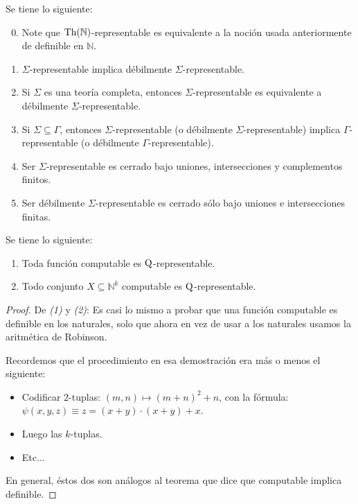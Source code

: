 \documentclass[12pt]{report}
\newcounter{it}
\theoremstyle{largebreak}
\begin{document}
    \begin{obs}
        Se tiene lo siguiente:
        \begin{enumerate}[label = \textit{(\arabic*)}]
            \setcounter{enumi}{-1}
            \item Note que $\textup{Th}(\mathbb{N})$-representable es equivalente a la noción usada anteriormente de definible en $\mathbb{N}$.
            \item $\Sigma$-representable implica débilmente $\Sigma$-representable.
            \item Si $\Sigma$ es una teoría completa, entonces $\Sigma$-representable es equivalente a débilmente $\Sigma$-representable.
            \item Si $\Sigma\subseteq\Gamma$, entonces $\Sigma$-representable (o débilmente $\Sigma$-representable) implica $\Gamma$-representable (o débilmente $\Gamma$-representable).
            \item Ser $\Sigma$-representable es cerrado bajo uniones, intersecciones y complementos finitos.
            \item Ser débilmente $\Sigma$-representable es cerrado sólo bajo uniones e intersecciones finitas.
        \end{enumerate}
    \end{obs}

    \begin{theor}
        Se tiene lo siguiente:
        \begin{enumerate}[label = \textit{(\arabic*)}]
            \item Toda función computable es $\textup{Q}$-representable.
            \item Todo conjunto $X\subseteq\mathbb{N}^k$ computable es $\textup{Q}$-representable.
        \end{enumerate}
    \end{theor}

    \begin{proof}
        De \textit{(1)} y \textit{(2)}: Es casi lo mismo a probar que una función computable es definible en los naturales, solo que ahora en vez de usar a los naturales usamos la aritmética de Robinson.

        Recordemos que el procedimiento en esa demostración era más o menos el siguiente:
        \begin{itemize}
            \item Codificar 2-tuplas: $(m,n)\mapsto(m+n)^2+n$, con la fórmula: $\psi(x,y,z)\equiv z=(x+y)\cdot(x+y)+x$.
            \item Luego las $k$-tuplas.
            \item Etc...
        \end{itemize}
        En general, éstos dos son análogos al teorema que dice que computable implica definible.
    \end{proof}
\end{document}
